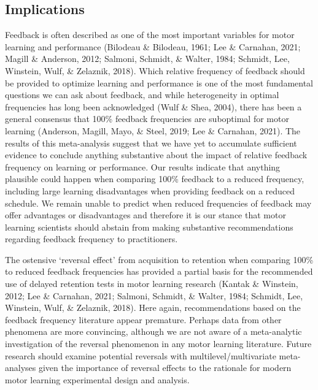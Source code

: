 \documentclass[
  english,
  man, donotrepeattitle,floatsintext]{apa7}
\begin{document}
\hypertarget{implications}{%
\subsection{Implications}\label{implications}}

Feedback is often described as one of the most important variables for motor learning and performance (Bilodeau \& Bilodeau, 1961; Lee \& Carnahan, 2021; Magill \& Anderson, 2012; Salmoni, Schmidt, \& Walter, 1984; Schmidt, Lee, Winstein, Wulf, \& Zelaznik, 2018). Which relative frequency of feedback should be provided to optimize learning and performance is one of the most fundamental questions we can ask about feedback, and while heterogeneity in optimal frequencies has long been acknowledged (Wulf \& Shea, 2004), there has been a general consensus that 100\% feedback frequencies are suboptimal for motor learning (Anderson, Magill, Mayo, \& Steel, 2019; Lee \& Carnahan, 2021). The results of this meta-analysis suggest that we have yet to accumulate sufficient evidence to conclude anything substantive about the impact of relative feedback frequency on learning or performance. Our results indicate that anything plausible could happen when comparing 100\% feedback to a reduced frequency, including large learning disadvantages when providing feedback on a reduced schedule. We remain unable to predict when reduced frequencies of feedback may offer advantages or disadvantages and therefore it is our stance that motor learning scientists should abstain from making substantive recommendations regarding feedback frequency to practitioners.

The ostensive `reversal effect' from acquisition to retention when comparing 100\% to reduced feedback frequencies has provided a partial basis for the recommended use of delayed retention tests in motor learning research (Kantak \& Winstein, 2012; Lee \& Carnahan, 2021; Salmoni, Schmidt, \& Walter, 1984; Schmidt, Lee, Winstein, Wulf, \& Zelaznik, 2018). Here again, recommendations based on the feedback frequency literature appear premature. Perhaps data from other phenomena are more convincing, although we are not aware of a meta-analytic investigation of the reversal phenomenon in any motor learning literature. Future research should examine potential reversals with multilevel/multivariate meta-analyses given the importance of reversal effects to the rationale for modern motor learning experimental design and analysis.
\end{document}
